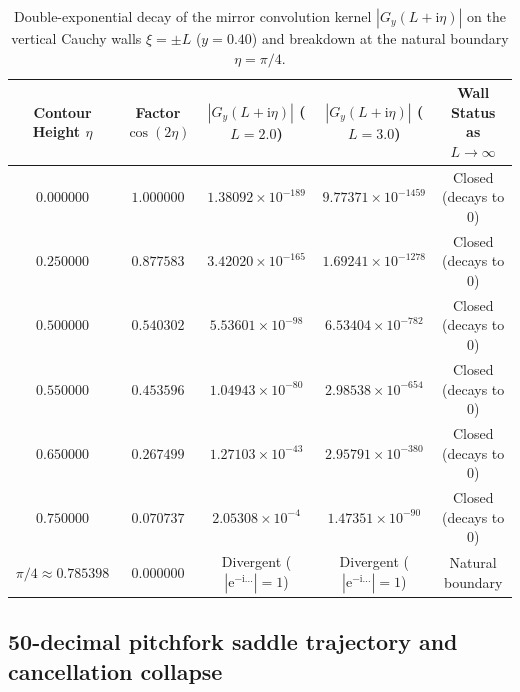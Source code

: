 \documentclass[11pt,a4paper,reqno]{amsart}
\theoremstyle{definition}
\theoremstyle{remark}
\numberwithin{equation}{section}
\newcommand{\ii}{\mathrm{i}}
\newcommand{\ee}{\mathrm{e}}
\begin{document}
\begin{table}[htbp]
\centering
\caption{Double-exponential decay of the mirror convolution kernel $|G_y(L+\ii\eta)|$ on the vertical Cauchy walls $\xi = \pm L$ ($y = 0.40$) and breakdown at the natural boundary $\eta = \pi/4$.}\label{tab:wall_decay}
\scriptsize
\setlength{\tabcolsep}{4.5pt}
\begin{tabular}{ccccc}
\toprule
\textbf{Contour Height $\eta$} & \textbf{Factor $\cos(2\eta)$} & \textbf{$|G_y(L+\ii\eta)|$ ($L=2.0$)} & \textbf{$|G_y(L+\ii\eta)|$ ($L=3.0$)} & \textbf{Wall Status as $L\to\infty$} \\
\midrule
$0.000000$ & $1.000000$ & $1.38092 \times 10^{-189}$ & $9.77371 \times 10^{-1459}$ & Closed (decays to $0$) \\
$0.250000$ & $0.877583$ & $3.42020 \times 10^{-165}$ & $1.69241 \times 10^{-1278}$ & Closed (decays to $0$) \\
$0.500000$ & $0.540302$ & $5.53601 \times 10^{-98}$  & $6.53404 \times 10^{-782}$  & Closed (decays to $0$) \\
$0.550000$ & $0.453596$ & $1.04943 \times 10^{-80}$  & $2.98538 \times 10^{-654}$  & Closed (decays to $0$) \\
$0.650000$ & $0.267499$ & $1.27103 \times 10^{-43}$  & $2.95791 \times 10^{-380}$  & Closed (decays to $0$) \\
$0.750000$ & $0.070737$ & $2.05308 \times 10^{-4}$   & $1.47351 \times 10^{-90}$   & Closed (decays to $0$) \\
$\pi/4 \approx 0.785398$ & $0.000000$ & Divergent ($|\ee^{-\ii\dots}|=1$) & Divergent ($|\ee^{-\ii\dots}|=1$) & Natural boundary \\
\bottomrule
\end{tabular}
\end{table}

\subsection{50-decimal pitchfork saddle trajectory and cancellation collapse}\label{subsec:num_saddles}
\end{document}
